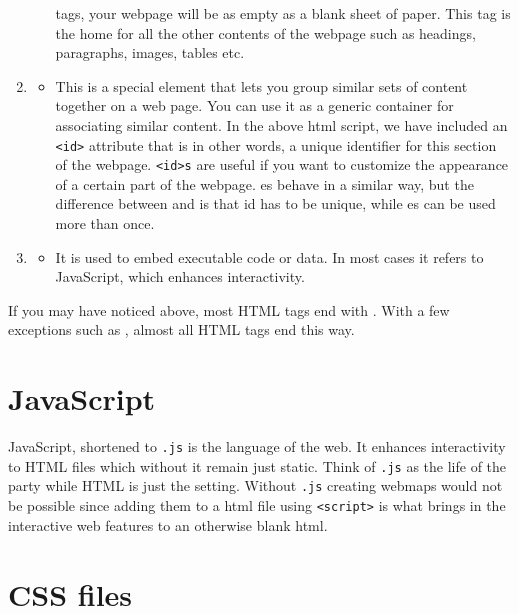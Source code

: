 \documentclass[
]{book}
\providecommand{\tightlist}{%
  \setlength{\itemsep}{0pt}\setlength{\parskip}{0pt}}
\theoremstyle{definition}
\theoremstyle{definition}
\theoremstyle{definition}
\theoremstyle{definition}
\theoremstyle{remark}
\begin{document}
\begin{enumerate}
\begin{itemize}
    tags, your webpage will be as empty as a blank sheet of paper. This tag is the home for all the other contents of the webpage such as headings, paragraphs, images, tables etc.
  \end{itemize}
\item
  \begin{itemize}
  \tightlist
  \item
    This is a special element that lets you group similar sets of content together on a web page. You can use it as a generic container for associating similar content. In the above html script, we have included an \texttt{\textless{}id\textgreater{}} attribute that is in other words, a unique identifier for this section of the webpage. \texttt{\textless{}id\textgreater{}s} are useful if you want to customize the appearance of a certain part of the webpage. es behave in a similar way, but the difference between and is that id has to be unique, while es can be used more than once.
  \end{itemize}
\item
  \begin{itemize}
  \tightlist
  \item
    It is used to embed executable code or data. In most cases it refers to JavaScript, which enhances interactivity.
  \end{itemize}
\end{enumerate}

If you may have noticed above, most HTML tags end with . With a few exceptions such as , almost all HTML tags end this way.

\hypertarget{javascript}{%
\section{JavaScript}\label{javascript}}

JavaScript, shortened to \texttt{.js} is the language of the web. It enhances interactivity to HTML files which without it remain just static. Think of \texttt{.js} as the life of the party while HTML is just the setting. Without \texttt{.js} creating webmaps would not be possible since adding them to a html file using \texttt{\textless{}script\textgreater{}} is what brings in the interactive web features to an otherwise blank html.

\hypertarget{css-files}{%
\section{CSS files}\label{css-files}}
\end{document}
